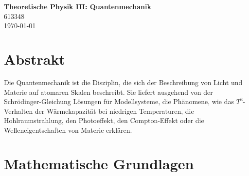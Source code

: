 \documentclass{article}
\begin{document}
\begin{center}
	\Large{\textbf{Theoretische Physik III: Quantenmechanik}}\\
	\small{613348}\\
	\small{\today}
\end{center}


{\small\tableofcontents}


\newpage


\section*{Abstrakt}
Die Quantenmechanik ist die Disziplin, die sich der Beschreibung von Licht und Materie auf atomaren Skalen beschreibt. Sie liefert ausgehend von der Schrödinger-Gleichung Lösungen für Modellsysteme, die Phänomene, wie das $T^3$-Verhalten der Wärmekapazität bei niedrigen Temperaturen, die Hohlraumstrahlung, den Photoeffekt, den Compton-Effekt oder die Welleneigentschaften von Materie erklären.


\newpage


\section{Mathematische Grundlagen}
\end{document}
